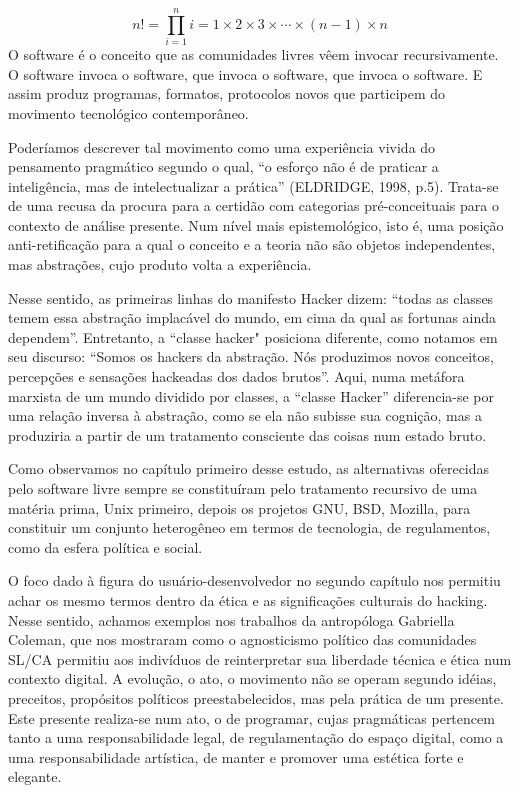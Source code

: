 \setcounter{equation}{1}
\begin{equation}
n!=\prod_{i=1}^n i= 1 \times 2 \times 3 \times \cdots \times (n - 1) \times n
\end{equation} \label{fig3.2}
O software é o conceito que as comunidades livres vêem invocar recursivamente. O software invoca o software, que invoca o software, que invoca o software. E assim produz programas, formatos, protocolos novos que participem do movimento tecnológico contemporâneo.

Poderíamos descrever tal movimento como uma experiência vivida do pensamento pragmático segundo o qual, “o esforço não é de praticar a inteligência, mas de intelectualizar a prática” (ELDRIDGE, 1998, p.5). Trata-se de uma recusa da procura para a certidão com categorias pré-conceituais para o contexto de análise presente. Num nível mais epistemológico, isto é, uma posição anti-retificação para a qual o conceito e a teoria não são objetos independentes, mas abstrações, cujo produto volta a experiência.

Nesse sentido, as primeiras linhas do manifesto Hacker dizem: “todas as classes temem essa abstração implacável do mundo, em cima da qual as fortunas ainda dependem”. Entretanto, a “classe hacker" posiciona diferente, como notamos em seu discurso: “Somos os hackers da abstração. Nós produzimos novos conceitos,  percepções e sensações hackeadas dos dados brutos”.  Aqui, numa metáfora marxista de um mundo dividido por classes, a “classe Hacker” diferencia-se por uma relação inversa à abstração, como se ela não subisse sua cognição, mas a produziria a partir de um tratamento consciente das coisas num estado bruto.

Como observamos no capítulo primeiro desse estudo, as alternativas oferecidas pelo software livre sempre se constituíram pelo tratamento recursivo de uma matéria prima, Unix primeiro, depois os projetos GNU, BSD, Mozilla, para constituir um conjunto heterogêneo em termos de tecnologia, de regulamentos, como da esfera política e social. 

O foco dado à figura do usuário-desenvolvedor no segundo capítulo nos permitiu achar os mesmo termos dentro da ética e as significações culturais do hacking. Nesse sentido, achamos exemplos nos trabalhos da antropóloga Gabriella Coleman, que nos mostraram como o agnosticismo político das comunidades SL/CA permitiu aos indivíduos de reinterpretar sua liberdade técnica e ética num contexto digital. A evolução, o ato, o movimento não se operam segundo idéias, preceitos, propósitos políticos preestabelecidos, mas pela prática de um presente. Este presente realiza-se num ato, o de programar, cujas pragmáticas pertencem tanto a uma responsabilidade legal, de regulamentação do espaço digital, como a uma responsabilidade artística, de manter e promover uma estética forte e elegante. 

